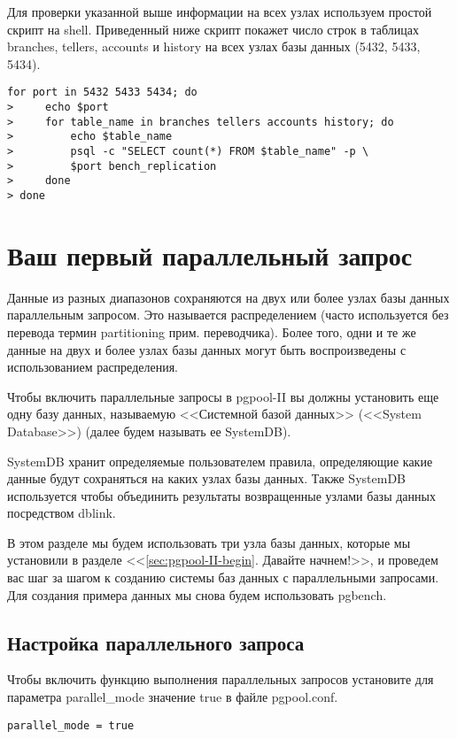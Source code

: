 Для проверки указанной выше информации на всех узлах используем простой скрипт на shell. 
Приведенный ниже скрипт покажет число строк в таблицах branches, tellers, accounts и history 
на всех узлах базы данных (5432, 5433, 5434).
\begin{lstlisting}[label=lst:pgpool21,caption=Проверка репликации]
for port in 5432 5433 5434; do
>     echo $port
>     for table_name in branches tellers accounts history; do
>         echo $table_name
>         psql -c "SELECT count(*) FROM $table_name" -p \
>         $port bench_replication
>     done
> done
\end{lstlisting}


\section{Ваш первый параллельный запрос}
Данные из разных диапазонов сохраняются на двух или более узлах базы данных параллельным запросом. 
Это называется распределением (часто используется без перевода термин partitioning прим. переводчика). 
Более того, одни и те же данные на двух и более узлах базы данных могут быть воспроизведены с использованием распределения.

Чтобы включить параллельные запросы в pgpool-II вы должны установить еще одну базу данных, называемую 
<<Системной базой данных>> (<<System Database>>) (далее будем называть ее SystemDB).

SystemDB хранит определяемые пользователем правила, определяющие какие данные будут сохраняться на каких узлах базы данных. 
Также SystemDB используется чтобы объединить результаты возвращенные узлами базы данных посредством dblink.

В этом разделе мы будем использовать три узла базы данных, которые мы установили в разделе <<\ref{sec:pgpool-II-begin}. 
Давайте начнем!>>, и проведем вас шаг за шагом к созданию системы баз данных с параллельными запросами. 
Для создания примера данных мы снова будем использовать pgbench.

\subsection{Настройка параллельного запроса}
Чтобы включить функцию выполнения параллельных запросов установите для параметра parallel\_mode значение true в файле pgpool.conf.
\begin{lstlisting}[label=lst:pgpool22,caption=Настройка параллельного запроса]
parallel_mode = true
\end{lstlisting}

